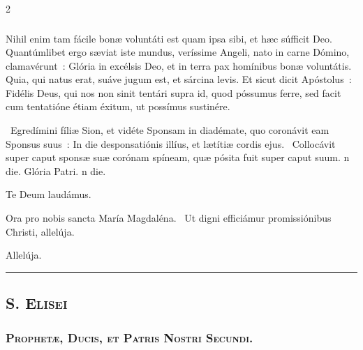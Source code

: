 \documentclass[9pt,twoside]{extarticle}
\begin{document}
\begin{multicols}{2}
\subsubsection*{\center {}}
Nihil enim tam fácile bonæ voluntáti est quam ipsa sibi, et hæc súfficit Deo. Quantúmlibet ergo sæviat iste mundus, veríssime Angeli, nato in carne Dómino, clamavérunt~: Glória in excélsis Deo, et in terra pax homínibus bonæ voluntátis. Quia, qui natus erat, suáve jugum est, et sárcina levis. Et sicut dicit Apóstolus~: Fidélis Deus, qui nos non sinit tentári supra id, quod póssumus ferre, sed facit cum tentatióne étiam éxitum, ut possímus sustinére.

\begin{tightlist}{}
\item {}~Egredímini fíliæ Sion, et vidéte Sponsam in diadémate, quo coronávit eam Sponsus suus~: \textred{*} In die desponsatiónis illíus, et lætítiæ cordis ejus. ~Collocávit super caput sponsæ suæ corónam spíneam, quæ pósita fuit super caput suum. n die. Glória Patri. n die.
\item Te Deum laudámus.
\item {} Ora pro nobis sancta María Magdaléna. ~Ut digni efficiámur promissiónibus Christi, allelúja.
\end{tightlist}

\begin{tightlist}{}
\item {}
\item {} Allelúja.
\end{tightlist}

\begin{center}\textcolor{red}{\rule{\linewidth}{0.5pt}} \end{center}

\subsection*{\center {}}
\subsection*{\center \textsc{S. Elisei}}
\subsubsection*{\center \textsc{Prophetæ, Ducis, et Patris Nostri Secundi.}}

\end{multicols}
\end{document}
